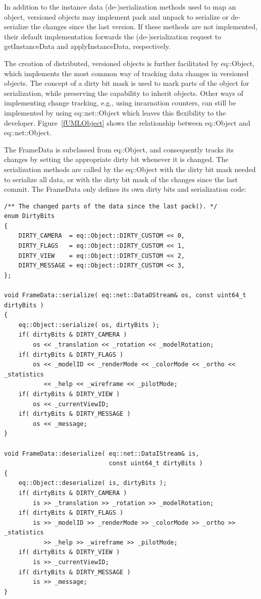 \documentclass[10pt,a4]{scrartcl}
\newcommand{\fig}[1]{Figure~\ref{#1}}
\begin{document}
In addition to the instance data (de-)serialization methods used to map
an object, versioned objects may implement \textsf{pack} and
\textsf{unpack} to serialize or de-serialize the changes since the last
version. If these methods are not implemented, their default
implementation forwards the (de-)serialization request to
\textsf{getInstanceData} and \textsf{applyInstanceData}, respectively.

The creation of distributed, versioned objects is further facilitated by
\textsf{eq::Object}, which implements the most common way of tracking
data changes in versioned objects. The concept of a dirty bit mask is
used to mark parts of the object for serialization, while preserving the
capability to inherit objects. Other ways of implementing change
tracking, e.g., using incarnation counters, can still be implemented by
using \textsf{eq::net::Object} which leaves this flexibility to the
developer. \fig{fUMLObject} shows the relationship between
\textsf{eq::Object} and \textsf{eq::net::Object}.

The \textsf{FrameData} is subclassed from \textsf{eq::Object}, and
consequently tracks its changes by setting the appropriate dirty bit
whenever it is changed. The serialization methods are called by the
\textsf{eq::Object} with the dirty bit mask needed to serialize all
data, or with the dirty bit mask of the changes since the last
\textsf{commit}. The \textsf{FrameData} only defines its own dirty bits
and serialization code:

{\footnotesize\begin{lstlisting}
/** The changed parts of the data since the last pack(). */
enum DirtyBits
{
    DIRTY_CAMERA  = eq::Object::DIRTY_CUSTOM << 0,
    DIRTY_FLAGS   = eq::Object::DIRTY_CUSTOM << 1,
    DIRTY_VIEW    = eq::Object::DIRTY_CUSTOM << 2,
    DIRTY_MESSAGE = eq::Object::DIRTY_CUSTOM << 3,
};

void FrameData::serialize( eq::net::DataOStream& os, const uint64_t dirtyBits )
{
    eq::Object::serialize( os, dirtyBits );
    if( dirtyBits & DIRTY_CAMERA )
        os << _translation << _rotation << _modelRotation;
    if( dirtyBits & DIRTY_FLAGS )
        os << _modelID << _renderMode << _colorMode << _ortho << _statistics
           << _help << _wireframe << _pilotMode;
    if( dirtyBits & DIRTY_VIEW )
        os << _currentViewID;
    if( dirtyBits & DIRTY_MESSAGE )
        os << _message;
}

void FrameData::deserialize( eq::net::DataIStream& is,
                             const uint64_t dirtyBits )
{
    eq::Object::deserialize( is, dirtyBits );
    if( dirtyBits & DIRTY_CAMERA )
        is >> _translation >> _rotation >> _modelRotation;
    if( dirtyBits & DIRTY_FLAGS )
        is >> _modelID >> _renderMode >> _colorMode >> _ortho >> _statistics
           >> _help >> _wireframe >> _pilotMode;
    if( dirtyBits & DIRTY_VIEW )
        is >> _currentViewID;
    if( dirtyBits & DIRTY_MESSAGE )
        is >> _message;
}
\end{lstlisting}}%
\end{document}
